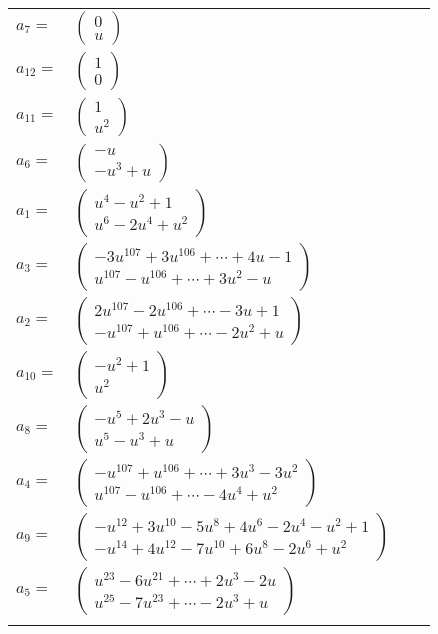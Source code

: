 \documentclass[1p]{elsarticle_modified}
\theoremstyle{definition}
\begin{document}
\begin{tabular}{m{7pt} m{180pt} m{7pt} m{180pt} }
\flushright $a_{7}=$&$\begin{pmatrix}0\\u\end{pmatrix}$ \\
\flushright $a_{12}=$&$\begin{pmatrix}1\\0\end{pmatrix}$ \\
\flushright $a_{11}=$&$\begin{pmatrix}1\\u^2\end{pmatrix}$ \\
\flushright $a_{6}=$&$\begin{pmatrix}- u\\- u^3+u\end{pmatrix}$ \\
\flushright $a_{1}=$&$\begin{pmatrix}u^4- u^2+1\\u^6-2 u^4+u^2\end{pmatrix}$ \\
\flushright $a_{3}=$&$\begin{pmatrix}-3 u^{107}+3 u^{106}+\cdots+4 u-1\\u^{107}- u^{106}+\cdots+3 u^2- u\end{pmatrix}$ \\
\flushright $a_{2}=$&$\begin{pmatrix}2 u^{107}-2 u^{106}+\cdots-3 u+1\\- u^{107}+u^{106}+\cdots-2 u^2+u\end{pmatrix}$ \\
\flushright $a_{10}=$&$\begin{pmatrix}- u^2+1\\u^2\end{pmatrix}$ \\
\flushright $a_{8}=$&$\begin{pmatrix}- u^5+2 u^3- u\\u^5- u^3+u\end{pmatrix}$ \\
\flushright $a_{4}=$&$\begin{pmatrix}- u^{107}+u^{106}+\cdots+3 u^3-3 u^2\\u^{107}- u^{106}+\cdots-4 u^4+u^2\end{pmatrix}$ \\
\flushright $a_{9}=$&$\begin{pmatrix}- u^{12}+3 u^{10}-5 u^8+4 u^6-2 u^4- u^2+1\\- u^{14}+4 u^{12}-7 u^{10}+6 u^8-2 u^6+u^2\end{pmatrix}$ \\
\flushright $a_{5}=$&$\begin{pmatrix}u^{23}-6 u^{21}+\cdots+2 u^3-2 u\\u^{25}-7 u^{23}+\cdots-2 u^3+u\end{pmatrix}$\\&\end{tabular}
\end{document}
